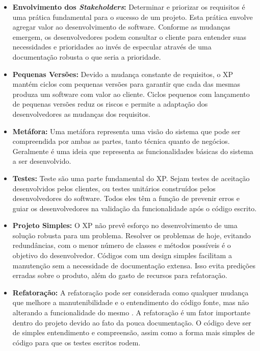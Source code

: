 \begin{itemize}

	\item \textbf{Envolvimento dos \textit{Stakeholders}:} Determinar e priorizar os requisitos é uma prática fundamental para o sucesso de um projeto.  Esta prática envolve agregar valor ao desenvolvimento de software. Conforme as mudanças emergem, os desenvolvedores podem consultar o cliente para entender suas necessidades e prioridades ao invés de especular através de uma documentação robusta o que seria a prioridade.

	\item \textbf{Pequenas Versões:} Devido a mudança constante de requisitos, o XP mantém ciclos com pequenas versões para garantir que cada das mesmas produza um software com valor ao cliente. Ciclos pequenos com lançamento de pequenas versões reduz os riscos e permite a adaptação dos desenvolvedores as mudanças dos requisitos.

	\item \textbf{Metáfora:} Uma metáfora representa uma visão do sistema que pode ser compreendida por ambas as partes, tanto técnica quanto de negócios. Geralmente é uma ideia que representa as funcionalidades básicas do sistema a ser desenvolvido.

	\item \textbf{Testes:} Teste são uma parte fundamental do XP. Sejam testes de aceitação desenvolvidos pelos clientes, ou testes unitários construídos pelos desenvolvedores do software. Todos eles têm a função de prevenir erros e guiar os desenvolvedores  na validação da funcionalidade após o código escrito.

	\item \textbf{Projeto Simples:} O XP não prevê esforço no desenvolvimento de uma solução robusta para um problema. Resolver os problemas de hoje, evitando redundâncias, com o menor número de classes e métodos possíveis é o objetivo do desenvolvedor. Códigos com um design simples facilitam a manutenção sem a necessidade de documentação extensa. Isso evita predições erradas sobre o produto, além do gasto de recursos para refatoração.

	\item \textbf{Refatoração:} A refatoração pode ser considerada como qualquer mudança que melhore a manutenibilidade e o entendimento do código fonte, mas não alterando a funcionalidade do mesmo \cite{Fowler:1999}.  A refatoração é um fator importante dentro do projeto devido ao fato da pouca documentação. O código deve ser de simples entendimento e compreensão, assim como a forma mais simples de código para que os testes escritos rodem.


\end{itemize}
